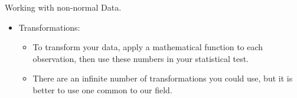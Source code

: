 \documentclass[
  ignorenonframetext,
]{beamer}
\providecommand{\tightlist}{%
  \setlength{\itemsep}{0pt}\setlength{\parskip}{0pt}}
\begin{document}
\begin{frame}{Working with non-normal Data.}
\label{working-with-non-normal-data.}
\begin{itemize}
\tightlist
\item
  Transformations:

  \begin{itemize}
  \item
    To transform your data, apply a mathematical function to each
    observation, then use these numbers in your statistical test.
  \item
    There are an infinite number of transformations you could use, but
    it is better to use one common to our field.
  \end{itemize}
\end{itemize}
\end{frame}
\end{document}
